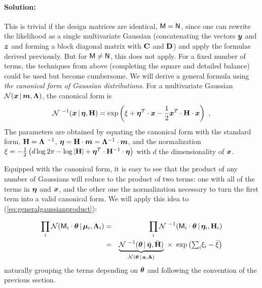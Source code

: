 \paragraph{Solution:}


This is trivial if the design matrices are identical, $\mathsf{M} = \mathsf{N}$, since one can rewrite the likelihood as a single multivariate Gaussian (concatenating the vectors $\boldsymbol{y}$ and $\boldsymbol{z}$ and forming a block diagonal matrix with $\mathbf{C}$ and $\mathbf{D}$) and apply the formulae derived previously. But for $\mathsf{M} \neq \mathsf{N}$, this does not apply. For a fixed number of terms, the techniques from above (completing the square and detailed balance) could be used but become cumbersome. We will derive a general formula using \textit{the canonical form of Gaussian distributions}.
For a multivariate Gaussian $\mathcal{N}\!\,(\boldsymbol{x}\,|\,\boldsymbol{m},\mathbf{\Lambda})$, the canonical form is
\begin{equation}
\normal^{\ -1}(\vx\given\veta, \tH) = \exp\left(\xi +  \veta^T\cdot\vx - \frac{1}{2}\vx^T \cdot\tH \cdot \vx\right)
~ ,
\end{equation}
The parameters are obtained by equating the canonical form with the standard form, $\tH = \tLambda^{\ -1}$, $\boldsymbol{\eta} = \mathbf{H}\cdot \boldsymbol{m} = \mathbf{\Lambda}^{-1}\cdot \boldsymbol{m}$, and the normalization
$\xi = -\frac{1}{2}\left( d\log 2\pi -\log|\mathbf{H}| + \boldsymbol{\eta}^T \cdot \mathbf{H}^{-1}\cdot \boldsymbol{\eta} \right)$
with $d$ the dimensionality of $\boldsymbol{x}$.

Equipped with the canonical form, it is easy to see that the product of any number of Gaussians will reduce to the product of two terms: one with all of the terms in $\boldsymbol{\eta}$ and $\boldsymbol{x}$, and the other one the normalization necessary to turn the first term into a valid canonical form. We will apply this idea to (\ref{eq:generalgaussianproduct}):

\begin{eqnarray}
\prod_i \normal( \mM_i\cdot\vtheta \given \vmu_i,\tLambda_i) &=& \prod_i \normal^{\ -1}( \mM_i\cdot\vtheta\given\veta_i, \tH_i) \\
&=&   \underbrace{\normal^{\ -1}(\vtheta\given\bar{\veta}, \bar{\tH})}_{ \normal(\vtheta\given\va,\tA) } \ \times \ \exp\left(\textstyle{\sum_i} \xi_i - \bar{\xi} \right)
\end{eqnarray}
naturally grouping the terms depending on $\boldsymbol{\theta}$ and following the convention of the previous section.


